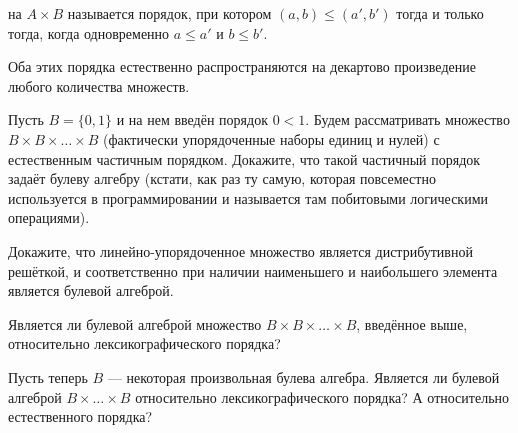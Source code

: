 \begin{definition}
 на $A\times B$ называется порядок, при котором $(a, b) \le (a', b')$ тогда и только тогда, когда одновременно $a \le a'$ и $b \le b'$.
\end{definition}

Оба этих порядка естественно распространяются на декартово произведение любого количества множеств.

\begin{exercise}
 Пусть $B = \{0, 1\}$ и на нем введён порядок $0 < 1$. Будем рассматривать множество $B\times B\times \ldots \times B$ (фактически упорядоченные наборы единиц и нулей) с естественным частичным порядком. Докажите, что такой частичный порядок задаёт булеву алгебру (кстати, как раз ту самую, которая повсеместно используется в программировании и называется там побитовыми логическими операциями).
\end{exercise}

\begin{exercise}
Докажите, что линейно-упорядоченное множество является дистрибутивной решёткой, и соответственно при наличии наименьшего и наибольшего элемента является булевой алгеброй.
\end{exercise}

\begin{exercise}
Является ли булевой алгеброй множество $B\times B \times \ldots \times B$, введённое выше, относительно лексикографического порядка?
\end{exercise}

\begin{exercise}
Пусть теперь $B$ — некоторая произвольная булева алгебра. Является ли булевой алгеброй $B\times \ldots \times B$ относительно лексикографического порядка? А относительно естественного порядка?
\end{exercise}
